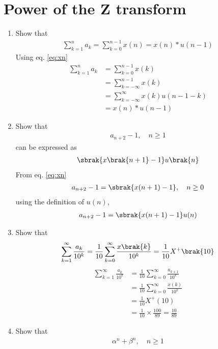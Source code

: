 \documentclass[journal,12pt,twocolumn]{IEEEtran}
\renewcommand\thesection{\arabic{section}}
\begin{document}
\section{Power of the Z transform}
\begin{enumerate}[label=\thesection.\arabic*,ref=\thesection.\theenumi]
\item Show that 
\begin{align}
	\sum_{k=1}^{n}a_k = 
	\sum_{k=0}^{n-1}x(n) = x(n)*u(n-1)
\end{align}
\solution Using eq. \ref{eq:xn}
\begin{align}
\sum_{k=1}^{n}a_k &= \sum_{k=0}^{n-1}x(k)\\ 
&= \sum_{k = -\infty}^{n - 1}x(k) \\ 
&= \sum_{k = -\infty}^{\infty}x(k)u(n - 1 - k)\\ 
&= x(n)*u(n - 1)
\end{align}
\item Show that 
\begin{align}
a_{n+2}-1, \quad n \ge 1
\end{align}
can be expressed as 
\begin{align}
	\sbrak{x\brak{n+1}-1}u\brak{n}
\end{align}
\solution From eq. \ref{eq:xn}
\begin{align}
a_{n+2} - 1 = \sbrak{x(n + 1) - 1}, \quad n \ge 0
\end{align}
using the definition of $u(n)$,
\begin{align}
a_{n+2} - 1 = \sbrak{x(n + 1) - 1}u(n)
\end{align}
 \item Show that 
\begin{align}
	\sum_{k=1}^{\infty}\frac{a_k}{10^k}= 
	\frac{1}{10}\sum_{k=0}^{\infty}\frac{x\brak{k}}{10^k} =\frac{1}{10}X^{+}\brak{{10}}
\end{align}
\solution 
\begin{align}
\sum_{k=1}^{\infty}\frac{a_k}{10^k} &= \frac{1}{10}\sum_{k = 0}^{\infty}\frac{a_{k+1}}{10^k}\\ 
&= \frac{1}{10}\sum_{k = 0}^{\infty}\frac{x(k)}{10^k}\\
&= \frac{1}{10}X^+(10) \\ 
&= \frac{1}{10}\times\frac{100}{89} = \frac{10}{89}
\end{align}
 \item Show that 
\begin{align}
	\alpha^n + \beta^n, \quad n \ge 1
\end{align}

\end{enumerate}
\end{document}
